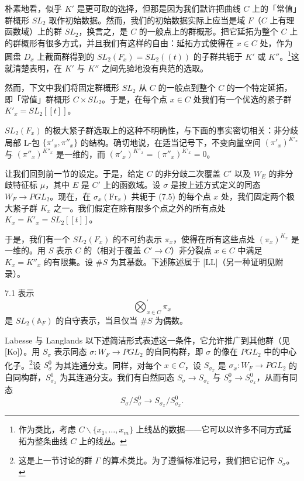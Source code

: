 朴素地看，似乎 $K'$ 是更可取的选择，但那是因为我们默许把曲线 $C$ 上的「常值」群概形 $SL_2$ 取作初始数据。然而，我们的初始数据实际上应当是域 $F$（$C$ 上有理函数域）上的群 $SL_2$，换言之，是 $C$ 的一般点上的群概形。把它延拓为整个 $C$ 上的群概形有很多方式，并且我们有这样的自由：延拓方式使得在 $x\in C$ 处，作为圆盘 $D_x$ 上截面群得到的 $SL_2(F_x)=SL_2((t))$ 的子群共轭于 $K'$ 或 $K''$。\footnote{作为类比，考虑 $C\backslash\{x_1,\ldots,x_m\}$ 上线丛的数据——它可以以许多不同方式延拓为整条曲线 $C$ 上的线丛。}这就清楚表明，在 $K'$ 与 $K''$ 之间先验地没有典范的选取。

然而，下文中我们将固定群概形 $SL_2$ 从 $C$ 的一般点到整个 $C$ 的一个特定延拓，即「常值」群概形 $C\times SL_2$。于是，在每个点 $x\in C$ 处我们有一个优选的紧子群 $K'_x=SL_2[[t]]$。

$SL_2(F_x)$ 的极大紧子群选取上的这种不明确性，与下面的事实密切相关：非分歧局部 L-包 $\{\pi'_x,\pi''_x\}$ 的结构。确切地说，在适当记号下，不变向量空间 $(\pi'_x)^{K'_x}$ 与 $(\pi''_x)^{K''_x}$ 是一维的，而 $(\pi'_x)^{K''_x}=(\pi''_x)^{K'_x}=0$。

让我们回到前一节的设定。于是，给定 $C$ 的非分歧二次覆盖 $C'$ 以及 $W_E$ 的非分歧特征标 $\mu$，其中 $E$ 是 $C'$ 上的函数域。设 $\sigma$ 是按上述方式定义的同态 $W_F\to PGL_2$。现在，在 $\sigma_x(\mathrm{Fr}_x)$ 共轭于 (7.5) 的每个点 $x$ 处，我们固定两个极大紧子群 $K_x$ 之一。我们假定在除有限多个点之外的所有点处 $K_x=K'_x=SL_2[[t]]$。

于是，我们有一个 $SL_2(F_x)$ 的不可约表示 $\pi_x$，使得在所有这些点处 $(\pi_x)^{K_x}$ 是一维的。用 $S$ 表示 $C$ 的（相对于覆盖 $C'\to C$）非分裂点 $x\in C$ 中满足 $K_x=K''_x$ 的有限集。设 $\#S$ 为其基数。下述陈述属于 [LL]（另一种证明见附录）。


\begin{namedthm}{7.1}
表示
\begin{equation}\tag{7.8}
\bigotimes_{x\in C}^{\prime}\pi_x
\end{equation}
是 $SL_2(\mathbb{A}_F)$ 的自守表示，当且仅当 $\#S$ 为偶数。
\end{namedthm}

Labesse 与 Langlands 以下述简洁形式表述这一条件，它允许推广到其他群（见 [Ko]）。用 $S_\sigma$ 表示同态 $\sigma: W_F\to PGL_2$ 的自同构群，即 $\sigma$ 的像在 $PGL_2$ 中的中心化子。\footnote{这是上一节讨论的群 $\Gamma$ 的算术类比。为了遵循标准记号，我们把它记作 $S_\sigma$。}设 $S_\sigma^0$ 为其连通分支。同样，对每个 $x\in C$，设 $S_{\sigma_x}$ 是 $\sigma_x: W_F\to PGL_2$ 的自同构群，$S_{\sigma_x}^0$ 为其连通分支。我们有自然同态 $S_\sigma\to S_{\sigma_x}$ 与 $S_\sigma^0\to S_{\sigma_x}^0$，从而有同态
\begin{equation}\tag{7.9}
S_\sigma/S_\sigma^0\to S_{\sigma_x}/S_{\sigma_x}^0.
\end{equation}

